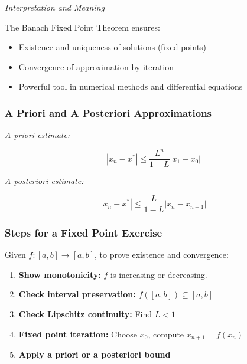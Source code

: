 \emph{Interpretation and Meaning}

The Banach Fixed Point Theorem ensures:

\begin{itemize}

    \item Existence and uniqueness of solutions (fixed points)

    \item Convergence of approximation by iteration

    \item Powerful tool in numerical methods and differential equations

\end{itemize}

\subsubsection{A Priori and A Posteriori Approximations}

\emph{A priori estimate:}

\[
    |x_n - x^*| \le \frac{L^n}{1 - L} |x_1 - x_0|
\]

\emph{A posteriori estimate:}

\[
    |x_n - x^*| \le \frac{L}{1 - L} |x_n - x_{n-1}|
\]

\subsubsection{Steps for a Fixed Point Exercise}

Given \(f: [a, b] \to [a, b]\), to prove existence and convergence:

\begin{enumerate}

    \item \textbf{Show monotonicity:} \(f\) is increasing or decreasing.

    \item \textbf{Check interval preservation:} \(f([a, b]) \subseteq [a, b]\)

    \item \textbf{Check Lipschitz continuity:} Find \(L < 1\)

    \item \textbf{Fixed point iteration:} Choose \(x_0\), compute \(x_{n+1} = f(x_n)\)

    \item \textbf{Apply a priori or a posteriori bound}

\end{enumerate}

